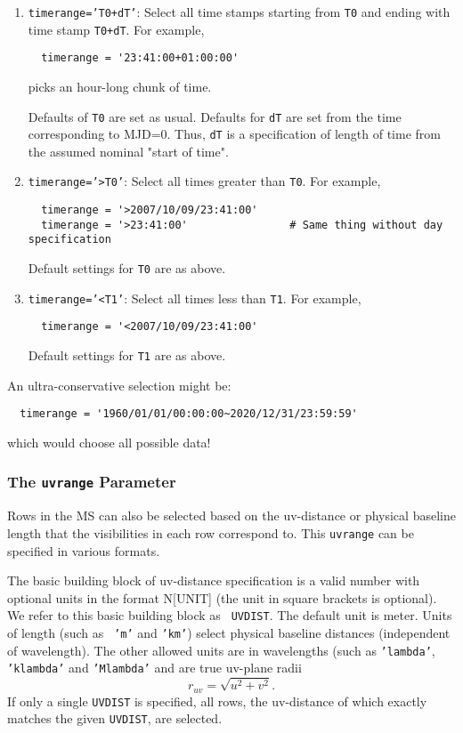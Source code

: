 \begin{enumerate}
\item {\tt timerange='T0+dT'}:  Select all time stamps starting from
{\tt T0} and ending with time stamp {\tt T0+dT}.  For example,
\small
\begin{verbatim}
  timerange = '23:41:00+01:00:00'
\end{verbatim}
\normalsize
picks an hour-long chunk of time.

Defaults of {\tt T0} are set as usual.  Defaults for {\tt dT} are set from the
time corresponding to MJD=0.  Thus, {\tt dT} is a specification of length of
time from the assumed nominal "start of time".

\item {\tt timerange='>T0'}: Select all times greater than {\tt T0}.
For example,
\small
\begin{verbatim}
  timerange = '>2007/10/09/23:41:00'
  timerange = '>23:41:00'                # Same thing without day specification
\end{verbatim}
\normalsize
Default settings for {\tt T0} are as above.

\item {\tt timerange='<T1'}: Select all times less than {\tt T1}.
For example,
\small
\begin{verbatim}
  timerange = '<2007/10/09/23:41:00'
\end{verbatim}
\normalsize
Default settings for {\tt T1} are as above.

\end{enumerate}

An ultra-conservative selection might be:
\small
\begin{verbatim}
  timerange = '1960/01/01/00:00:00~2020/12/31/23:59:59'
\end{verbatim}
\normalsize
which would choose all possible data!

\subsubsection{The {\tt uvrange} Parameter}
\label{section:io.selection.selectdata.uvrange}

Rows in the MS can also be selected based on the uv-distance or
physical baseline length that the visibilities in each row correspond
to.  This {\tt uvrange} can be specified in various formats.

The basic building block of uv-distance specification is a valid
number with optional units in the format N[UNIT] (the unit in square
brackets is optional).  We refer to this basic building block as {\tt
UVDIST}.  The default unit is meter.  Units of length (such as {\tt
'm'} and {\tt 'km'}) select physical baseline distances (independent
of wavelength).  The other allowed units are in wavelengths (such as
{\tt 'lambda'}, {\tt 'klambda'} and {\tt 'Mlambda'} 
and are true uv-plane radii
\begin{equation}
  r_{uv} = \sqrt{u^2+v^2}.
\end{equation}
If only a single {\tt UVDIST} is specified, all rows, the uv-distance of which
exactly matches the given {\tt UVDIST}, are selected.

